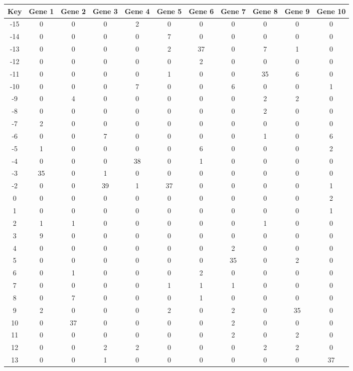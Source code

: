 \begin{tabular}{|c|c|c|c|c|c|c|c|c|c|c|}
\hline
Key & Gene 1 & Gene 2 & Gene 3 & Gene 4 & Gene 5 & Gene 6 & Gene 7 & Gene 8 & Gene 9 & Gene 10 \\
\hline
-15 & 0 & 0 & 0 & 2 & 0 & 0 & 0 & 0 & 0 & 0 \\
-14 & 0 & 0 & 0 & 0 & 7 & 0 & 0 & 0 & 0 & 0 \\
-13 & 0 & 0 & 0 & 0 & 2 & 37 & 0 & 7 & 1 & 0 \\
-12 & 0 & 0 & 0 & 0 & 0 & 2 & 0 & 0 & 0 & 0 \\
-11 & 0 & 0 & 0 & 0 & 1 & 0 & 0 & 35 & 6 & 0 \\
-10 & 0 & 0 & 0 & 7 & 0 & 0 & 6 & 0 & 0 & 1 \\
-9 & 0 & 4 & 0 & 0 & 0 & 0 & 0 & 2 & 2 & 0 \\
-8 & 0 & 0 & 0 & 0 & 0 & 0 & 0 & 2 & 0 & 0 \\
-7 & 2 & 0 & 0 & 0 & 0 & 0 & 0 & 0 & 0 & 0 \\
-6 & 0 & 0 & 7 & 0 & 0 & 0 & 0 & 1 & 0 & 6 \\
-5 & 1 & 0 & 0 & 0 & 0 & 6 & 0 & 0 & 0 & 2 \\
-4 & 0 & 0 & 0 & 38 & 0 & 1 & 0 & 0 & 0 & 0 \\
-3 & 35 & 0 & 1 & 0 & 0 & 0 & 0 & 0 & 0 & 0 \\
-2 & 0 & 0 & 39 & 1 & 37 & 0 & 0 & 0 & 0 & 1 \\
0 & 0 & 0 & 0 & 0 & 0 & 0 & 0 & 0 & 0 & 2 \\
1 & 0 & 0 & 0 & 0 & 0 & 0 & 0 & 0 & 0 & 1 \\
2 & 1 & 1 & 0 & 0 & 0 & 0 & 0 & 1 & 0 & 0 \\
3 & 9 & 0 & 0 & 0 & 0 & 0 & 0 & 0 & 0 & 0 \\
4 & 0 & 0 & 0 & 0 & 0 & 0 & 2 & 0 & 0 & 0 \\
5 & 0 & 0 & 0 & 0 & 0 & 0 & 35 & 0 & 2 & 0 \\
6 & 0 & 1 & 0 & 0 & 0 & 2 & 0 & 0 & 0 & 0 \\
7 & 0 & 0 & 0 & 0 & 1 & 1 & 1 & 0 & 0 & 0 \\
8 & 0 & 7 & 0 & 0 & 0 & 1 & 0 & 0 & 0 & 0 \\
9 & 2 & 0 & 0 & 0 & 2 & 0 & 2 & 0 & 35 & 0 \\
10 & 0 & 37 & 0 & 0 & 0 & 0 & 2 & 0 & 0 & 0 \\
11 & 0 & 0 & 0 & 0 & 0 & 0 & 2 & 0 & 2 & 0 \\
12 & 0 & 0 & 2 & 2 & 0 & 0 & 0 & 2 & 2 & 0 \\
13 & 0 & 0 & 1 & 0 & 0 & 0 & 0 & 0 & 0 & 37 \\
\hline
\end{tabular}